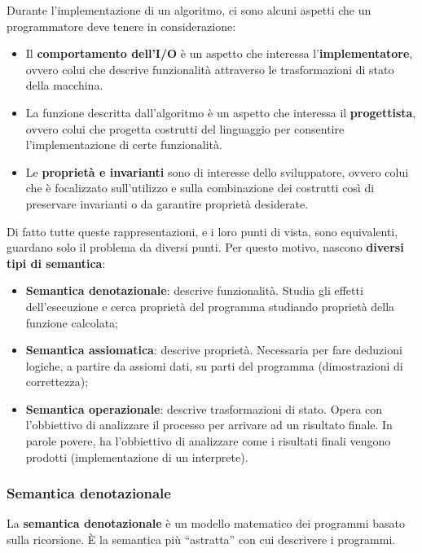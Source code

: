 \documentclass[a4paper]{article}
\newcommand{\dquotes}[1]{``#1''}
\begin{document}
	Durante l'implementazione di un algoritmo, ci sono alcuni aspetti che un programmatore deve tenere in considerazione:
	\begin{itemize}
		\item Il \textbf{comportamento dell'I/O} è un aspetto che interessa l'\textbf{implementatore}, ovvero colui che descrive funzionalità attraverso le trasformazioni di stato della macchina.
	
		\item La funzione descritta dall'algoritmo è un aspetto che interessa il \textbf{progettista}, ovvero colui che progetta costrutti del linguaggio per consentire l'implementazione di certe funzionalità.
	
		\item Le \textbf{proprietà e invarianti} sono di interesse dello sviluppatore, ovvero colui che è focalizzato sull'utilizzo e sulla combinazione dei costrutti così di preservare invarianti o da garantire proprietà desiderate.
	\end{itemize}
	Di fatto tutte queste rappresentazioni, e i loro punti di vista, sono equivalenti, guardano solo il problema da diversi punti. Per questo motivo, nascono \textbf{diversi tipi di semantica}:
	\begin{itemize}
		\item \textbf{Semantica denotazionale}: descrive funzionalità. Studia gli effetti dell'esecuzione e cerca proprietà del programma studiando proprietà della funzione calcolata;
		
		\item \textbf{Semantica assiomatica}: descrive proprietà. Necessaria per fare deduzioni logiche, a partire da assiomi dati, su parti del programma (dimostrazioni di correttezza);
		
		\item \textbf{Semantica operazionale}: descrive trasformazioni di stato. Opera con l'obbiettivo di analizzare il processo per arrivare ad un risultato finale. In parole povere, ha l'obbiettivo di analizzare come i risultati finali vengono prodotti (implementazione di un interprete).
	\end{itemize}\newpage

	\subsubsection{Semantica denotazionale}
	
	\begin{boxdef}
		La \textcolor{Red3}{\textbf{semantica denotazionale}} è un modello matematico dei programmi basato sulla ricorsione. È la semantica più \dquotes{astratta} con cui descrivere i programmi.
	\end{boxdef}
	
\end{document}

